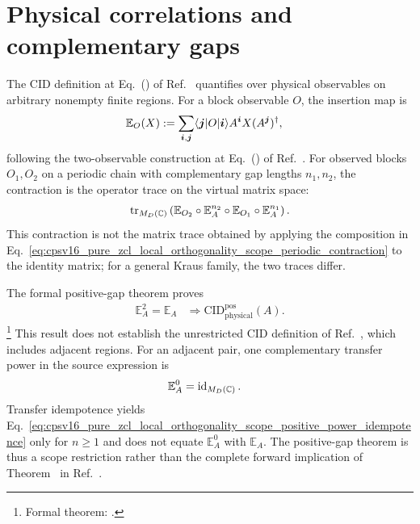 \documentclass{article}
\begin{document}
\section{Physical correlations and complementary gaps}

The CID definition at Eq.~() of Ref.~\cite{Cirac2016MPDO_arXiv}
quantifies over physical observables on arbitrary nonempty finite regions.
For a block observable $O$, the insertion map is
\begin{align}
    \mathbb E_O(X)
        &:=
        \sum_{\boldsymbol i,\boldsymbol j}
        \langle \boldsymbol j|O|\boldsymbol i\rangle
        A^{\boldsymbol i}X(A^{\boldsymbol j})^\dagger,
    \label{eq:cpsv16_pure_zcl_local_orthogonality_scope_observable_insertion}
\end{align}
following the two-observable construction at Eq.~() of
Ref.~\cite{Cirac2016MPDO_arXiv}. For observed blocks $O_1,O_2$ on a periodic
chain with complementary gap lengths $n_1,n_2$, the contraction is the
operator trace on the virtual matrix space:
\begin{align}
    \operatorname{tr}_{M_D(\mathbb{C})}
    \left(\mathbb E_{O_2}\circ\mathbb E_A^{n_2}
        \circ\mathbb E_{O_1}\circ\mathbb E_A^{n_1}\right).
    \label{eq:cpsv16_pure_zcl_local_orthogonality_scope_periodic_contraction}
\end{align}
This contraction is not the matrix trace obtained by applying the composition
in Eq.~\ref{eq:cpsv16_pure_zcl_local_orthogonality_scope_periodic_contraction}
to the identity matrix; for a general Kraus family, the two traces differ.

The formal positive-gap theorem proves
\begin{align}
    \mathbb E_A^2=\mathbb E_A
        &\Longrightarrow
        \mathrm{CID}^{\mathrm{pos}}_{\mathrm{physical}}(A).
    \label{eq:cpsv16_pure_zcl_local_orthogonality_scope_idempotence_positive_gap_cid}
\end{align}
\footnote{Formal theorem:
.}
This result does not establish the unrestricted CID definition of
Ref.~\cite{Cirac2016MPDO_arXiv}, which includes adjacent regions. For an
adjacent pair, one complementary transfer power in the source expression is
\begin{align}
    \mathbb E_A^0
        &= \operatorname{id}_{M_D(\mathbb{C})}.
    \label{eq:cpsv16_pure_zcl_local_orthogonality_scope_zero_gap_power}
\end{align}
Transfer idempotence yields
Eq.~\ref{eq:cpsv16_pure_zcl_local_orthogonality_scope_positive_power_idempotence}
only for $n\geq 1$ and does not equate $\mathbb E_A^0$ with $\mathbb E_A$. The
positive-gap theorem is thus a scope restriction rather than the complete
forward implication of Theorem~ in
Ref.~\cite{Cirac2016MPDO_arXiv}.
\end{document}
